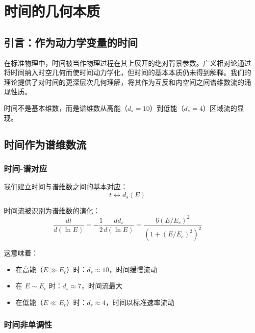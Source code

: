 \chapter{时间的几何本质}
\label{chap:time}

\section{引言：作为动力学变量的时间}

在标准物理中，时间被当作物理过程在其上展开的绝对背景参数。广义相对论通过将时间纳入时空几何而使时间动力学化，但时间的基本本质仍未得到解释。我们的理论提供了对时间的更深层次几何理解，将其作为互反和内空间之间谱维数流的涌现性质。

\begin{keyinsight}
时间不是基本维数，而是谱维数从高能（$d_s = 10$）到低能（$d_s = 4$）区域流的显现。
\end{keyinsight}

\section{时间作为谱维数流}

\subsection{时间-谱对应}

我们建立时间与谱维数之间的基本对应：
\begin{equation}
    t \longleftrightarrow d_s(E)
\end{equation}

时间流被识别为谱维数的演化：
\begin{equation}
    \frac{dt}{d(\ln E)} = -\frac{1}{2}\frac{dd_s}{d(\ln E)} = \frac{6(E/E_c)^2}{(1 + (E/E_c)^2)^2}
\end{equation}

这意味着：
\begin{itemize}
    \item 在高能（$E \gg E_c$）时：$d_s \approx 10$，时间缓慢流动
    \item 在 $E \sim E_c$ 时：$d_s \approx 7$，时间流最大
    \item 在低能（$E \ll E_c$）时：$d_s \approx 4$，时间以标准速率流动
\end{itemize}

\subsection{时间非单调性}


